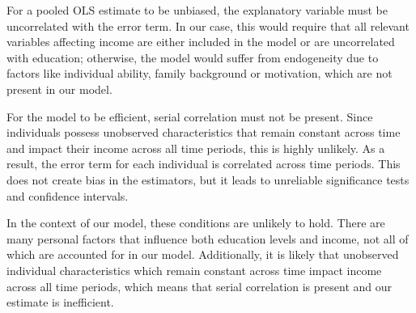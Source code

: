 For a pooled OLS estimate to be unbiased, the explanatory variable must be uncorrelated with the error term. In our case, this would require that all relevant variables affecting income are either included in the model or are uncorrelated with education; otherwise, the model would suffer from endogeneity due to factors like individual ability, family background or motivation, which are not present in our model.

For the model to be efficient, serial correlation must not be present. Since individuals possess unobserved characteristics that remain constant across time and impact their income across all time periods, this is highly unlikely. As a result, the error term for each individual is correlated across time periods. This does not create bias in the estimators, but it leads to unreliable significance tests and confidence intervals.

In the context of our model, these conditions are unlikely to hold. There are many personal factors that influence both education levels and income, not all of which are accounted for in our model. Additionally, it is likely that unobserved individual characteristics which remain constant across time impact income across all time periods, which means that serial correlation is present and our estimate is inefficient.